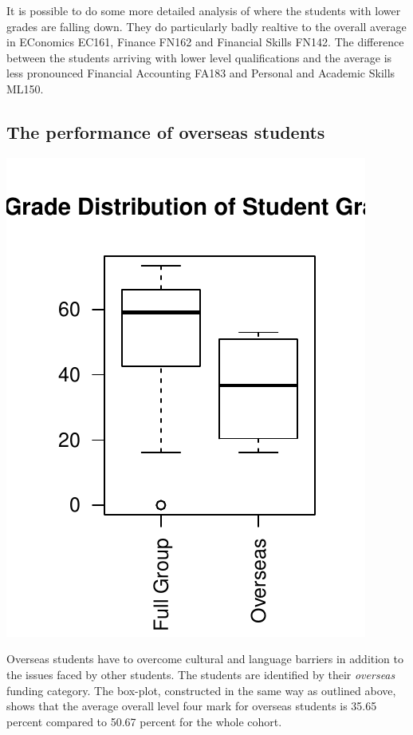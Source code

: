 \documentclass[12pt, a4paper, oneside]{article}\usepackage[]{graphicx}\usepackage[]{color}
\makeatletter
\def\maxwidth{ %
  \ifdim\Gin@nat@width>\linewidth
    \linewidth
  \else
    \Gin@nat@width
  \fi
}
\newenvironment{knitrout}{}{} %
\makeatother
\begin{document}
It is possible to do some more detailed analysis of where the students with lower grades are falling down. They do particularly badly realtive to the overall average in EConomics EC161, Finance FN162 and Financial Skills FN142.   The difference between the students arriving with lower level qualifications and the average is less pronounced Financial Accounting FA183 and Personal and Academic Skills ML150. 

\subsection*{The performance of overseas students}
\begin{knitrout}
\color{fgcolor}
\includegraphics[width=\maxwidth]{figure/boxplot3} 

\end{knitrout}

Overseas students have to overcome cultural and language barriers in addition to the issues faced by other students.  The students are identified by their \emph{overseas} funding category.  The box-plot, constructed in the same way as outlined above, shows that the average overall level four mark for overseas students is 35.65 percent compared to 50.67 percent for the whole cohort.  
\end{document}

